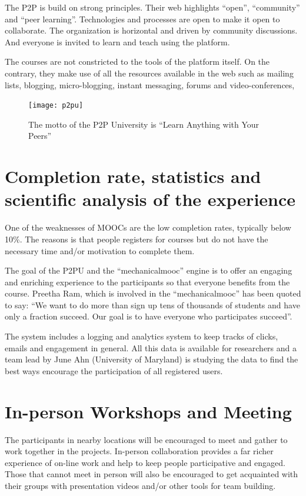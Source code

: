 \documentclass[oneside]{book}   %
\begin{document}
The P2P is build on strong principles. 
Their web highlights ``open'', ``community'' and ``peer learning''.
Technologies and processes are open to make it open to collaborate.
The organization is horizontal and driven by community discussions.
And everyone is invited to learn and teach using the platform.

The courses are not constricted to the tools of the platform itself. 
On the contrary, they make use of all the resources available in the web such as mailing lists, blogging, micro-blogging, instant messaging, forums and video-conferences, 

\begin{figure}
\begin{center}
\texttt{[image: p2pu]}
\caption{The motto of the P2P University is ``Learn Anything with Your Peers''}
\label{fig:p2pu}
\end{center}
\end{figure}

\section{Completion rate, statistics and scientific analysis of the experience}

One of the weaknesses of MOOCs are the low completion rates, typically below 10\%.
The reasons is that people registers for courses but do not have the necessary time and/or motivation to complete them.

The goal of the P2PU and the ``mechanicalmooc'' engine is to offer an engaging and enriching experience to the participants so that everyone benefits from the course.
Preetha Ram, which is involved in the ``mechanicalmooc'' has been quoted to say: ``We want to do more than sign up tens of thousands of students and have only a fraction succeed. Our goal is to have everyone who participates succeed''.

The system includes a logging and analytics system to keep tracks of clicks, emails and engagement in general.
All this data is available for researchers and a team lead by June Ahn (University of Maryland) is studying the data to find the best ways encourage the participation of all registered users.

\section{In-person Workshops and Meeting}

The participants in nearby locations will be encouraged to meet and gather to work together in the projects.
In-person collaboration provides a far richer experience of on-line work and help to keep people participative and engaged.
Those that cannot meet in person will also be encouraged to get acquainted with their groups with presentation videos and/or other tools for team building.
\end{document}
